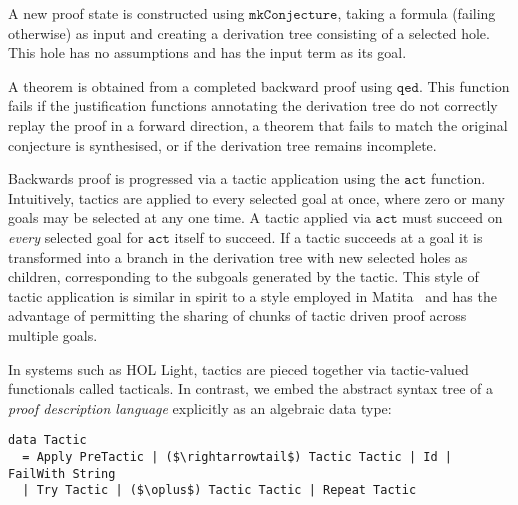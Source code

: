 \documentclass{llncs}
\begin{document}
A new proof state is constructed using $\mathtt{mkConjecture}$, taking a formula (failing otherwise) as input and creating a derivation tree consisting of a selected hole.
This hole has no assumptions and has the input term as its goal.

A theorem is obtained from a completed backward proof using $\mathtt{qed}$.
This function fails if the justification functions annotating the derivation tree do not correctly replay the proof in a forward direction, a theorem that fails to match the original conjecture is synthesised, or if the derivation tree remains incomplete.

Backwards proof is progressed via a tactic application using the $\mathtt{act}$ function.
Intuitively, tactics are applied to every selected goal at once, where zero or many goals may be selected at any one time.
A tactic applied via $\mathtt{act}$ must succeed on \emph{every} selected goal for $\mathtt{act}$ itself to succeed.
If a tactic succeeds at a goal it is transformed into a branch in the derivation tree with new selected holes as children, corresponding to the subgoals generated by the tactic.
This style of tactic application is similar in spirit to a style employed in Matita~\cite{asperti:matita:2011} and has the advantage of permitting the sharing of chunks of tactic driven proof across multiple goals.

In systems such as HOL Light, tactics are pieced together via tactic-valued functionals called tacticals.
In contrast, we embed the abstract syntax tree of a \emph{proof description language} explicitly as an algebraic data type:
\begin{lstlisting}
data Tactic
  = Apply PreTactic | ($\rightarrowtail$) Tactic Tactic | Id | FailWith String
  | Try Tactic | ($\oplus$) Tactic Tactic | Repeat Tactic
\end{lstlisting}
\end{document}
